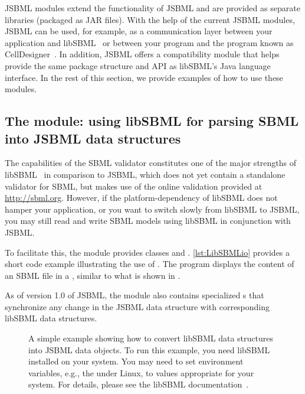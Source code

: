 JSBML modules extend the functionality of JSBML and are provided as
separate libraries (packaged as JAR files). With the help of the current
JSBML modules, JSBML can be used, for example, as a communication layer
 between your application and
libSBML~\citep{Bornstein2008} or between your program and the program known
as CellDesigner~\citep{Funahashi2003}. In addition, JSBML offers a
compatibility module %
that helps provide the same package structure and API as libSBML's Java
language interface. In the rest of this section, we provide examples of how
to use these modules.


\subsection{The  module: using libSBML for parsing
  SBML into JSBML data structures}

The capabilities of the SBML validator constitutes one
of the major strengths of libSBML~\citep{Bornstein2008} in comparison to
JSBML, which does not yet contain a standalone validator for SBML, but makes
use of the online validation provided at \url{http://sbml.org}. However, if
the platform-dependency of libSBML does not hamper your application, or you
want to switch slowly from libSBML to JSBML, you may still read and write
SBML models using libSBML in conjunction with JSBML.

To facilitate this, the module  provides classes
\LibSBMLReader and \LibSBMLWriter.  \vref{lst:LibSBMLio} provides a short
code example illustrating the use of \LibSBMLReader.  The program displays the
content of an SBML file in a \JTree, similar to what is shown in
.

As of version 1.0 of JSBML, the  module also contains
specialized \TreeNodeChangeListener{}s that synchronize any change in the
JSBML data structure with corresponding libSBML data structures.

\begin{figure}[htb]
  \caption{A simple example showing how to convert libSBML data structures
    into JSBML data objects.  To run this example, you need libSBML
    installed on your system.  You may need to set environment variables,
    e.g., the 
    under Linux, to values appropriate for your
    system. For details, please see the libSBML
    documentation~\cite{libSBMLwebsite}.}
  \label{lst:LibSBMLio}
\end{figure}


